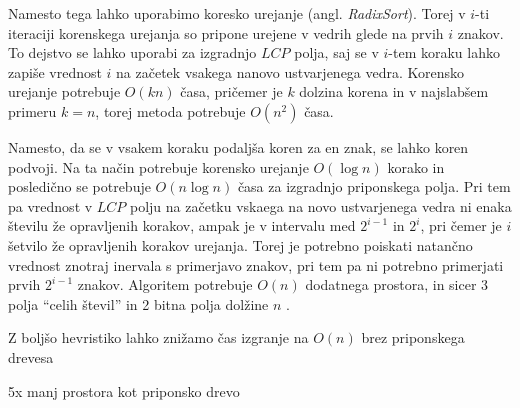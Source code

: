 Namesto tega lahko uporabimo koresko urejanje (angl. \textit{RadixSort}). Torej v $i$-ti iteraciji korenskega urejanja so pripone urejene v vedrih glede na prvih $i$ znakov. To dejstvo se lahko uporabi za izgradnjo $LCP$ polja, saj se v $i$-tem koraku lahko zapiše vrednost $i$ na začetek vsakega nanovo ustvarjenega vedra. Korensko urejanje potrebuje $O(kn)$ časa, pričemer je $k$ dolzina korena in v najslabšem primeru $k=n$, torej metoda potrebuje $O(n^2)$ časa.

Namesto, da se v vsakem koraku podaljša koren za en znak, se lahko koren podvoji. Na ta način potrebuje korensko urejanje $O(\log{n})$ korako in posledično se potrebuje $O(n\log{n})$ časa za izgradnjo priponskega polja. Pri tem pa vrednost v $LCP$ polju na začetku vskaega na novo ustvarjenega vedra ni enaka številu že opravljenih korakov, ampak je v intervalu med $2^{i-1}$ in $2^{i}$, pri čemer je $i$ šetvilo že opravljenih korakov urejanja. Torej je potrebno poiskati natančno vrednost znotraj inervala s primerjavo znakov, pri tem pa ni potrebno primerjati prvih $2^{i-1}$ znakov. Algoritem potrebuje $O(n)$ dodatnega prostora, in sicer 3 polja \enquote{celih števil} in 2 bitna polja dolžine $n$ \cite{Manber1990}.

Z boljšo hevristiko lahko znižamo čas izgranje na $O(n)$ brez priponskega drevesa\cite{Ko2005}



5x manj prostora kot priponsko drevo\cite{Manber1990}

